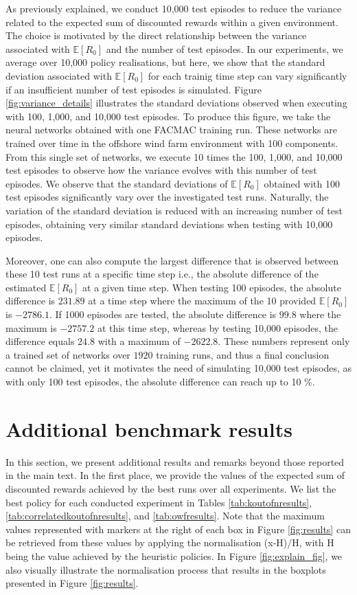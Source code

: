 As previously explained, we conduct 10,000 test episodes to reduce the variance related to the expected sum of discounted rewards within a given environment.
The choice is motivated by the direct relationship between the variance associated with $\mathbb{E}[R_{0}]$ and the number of test episodes. 
In our experiments, we average over 10,000 policy realisations, but here, we show that the standard deviation associated with $\mathbb{E}[R_{0}]$ for each trainig time step can vary significantly if an insufficient number of test episodes is simulated.
Figure \ref{fig:variance_details} illustrates the standard deviations observed when executing with 100, 1,000, and 10,000 test episodes.
To produce this figure, we take the neural networks obtained with one FACMAC training run.
These networks are trained over time in the offshore wind farm environment with 100 components.
From this single set of networks, we execute 10 times the 100, 1,000, and 10,000 test episodes to observe how the variance evolves with this number of test episodes.
We observe that the standard deviations of $\mathbb{E}[R_{0}]$ obtained with 100 test episodes significantly vary over the investigated test runs.
Naturally, the variation of the standard deviation is reduced with an increasing number of test episodes, obtaining very similar standard deviations when testing with 10,000 episodes.

Moreover, one can also compute the largest difference that is observed between these 10 test runs at a specific time step i.e., the absolute difference of the estimated $\mathbb{E}[R_{0}]$ at a given time step.
When testing 100 episodes, the absolute difference is $231.89$ at a time step where the maximum of the 10 provided $\mathbb{E}[R_{0}]$ is $ -2786.1$.
If 1000 episodes are tested, the absolute difference is $99.8$ where the maximum is $-2757.2$ at this time step, whereas by testing 10,000 episodes, the difference equals $24.8$ with a maximum of $-2622.8$.
These numbers represent only a trained set of networks over $1920$ training runs, and thus a final conclusion cannot be claimed, yet it motivates the need of simulating 10,000 test episodes, as with only 100 test episodes, the absolute difference can reach up to 10 \%.

\section{Additional benchmark results}
\label{app:add_results}
In this section, we present additional results and remarks beyond those reported in the main text.
In the first place, we provide the values of the expected sum of discounted rewards achieved by the best runs over all experiments.
We list the best policy for each conducted experiment in Tables \ref{tab:koutofnresults}, \ref{tab:correlatedkoutofnresults}, and \ref{tab:owfresults}.
Note that the maximum values represented with markers at the right of each box in Figure \ref{fig:results} can be retrieved from these values by applying the normalisation (x-H)/H, with H being the value achieved by the heuristic policies.
In Figure \ref{fig:explain_fig}, we also visually illustrate the normalisation process that results in the boxplots presented in Figure \ref{fig:results}.

